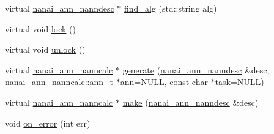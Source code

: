 \begin{DoxyCompactItemize}
\item 
virtual \hyperlink{namespacenanai_a892a8c80381d0005a076b68fbbf2d918}{nanai\+\_\+ann\+\_\+nanndesc} $\ast$ \hyperlink{classnanai_1_1nanai__ann__nannmgr_aa3fdb4c566c9f8b670631fb559cf1b02}{find\+\_\+alg} (std\+::string alg)
\item 
virtual void \hyperlink{classnanai_1_1nanai__ann__nannmgr_ad67bf88a3df568c5ed07c2adca863be8}{lock} ()
\item 
virtual void \hyperlink{classnanai_1_1nanai__ann__nannmgr_a061504e906faa17ab8cfeccb0f6c17bf}{unlock} ()
\item 
virtual \hyperlink{classnanai_1_1nanai__ann__nanncalc}{nanai\+\_\+ann\+\_\+nanncalc} $\ast$ \hyperlink{classnanai_1_1nanai__ann__nannmgr_a66d329677b38c6d967a737adabaae13e}{generate} (\hyperlink{namespacenanai_a892a8c80381d0005a076b68fbbf2d918}{nanai\+\_\+ann\+\_\+nanndesc} \&desc, \hyperlink{classnanai_1_1nanai__ann__nanncalc_1_1ann__t}{nanai\+\_\+ann\+\_\+nanncalc\+::ann\+\_\+t} $\ast$ann=N\+U\+L\+L, const char $\ast$task=N\+U\+L\+L)
\item 
virtual \hyperlink{classnanai_1_1nanai__ann__nanncalc}{nanai\+\_\+ann\+\_\+nanncalc} $\ast$ \hyperlink{classnanai_1_1nanai__ann__nannmgr_a5f3d6ac53777ccec4d85cde98267693f}{make} (\hyperlink{namespacenanai_a892a8c80381d0005a076b68fbbf2d918}{nanai\+\_\+ann\+\_\+nanndesc} \&desc)
\item 
void \hyperlink{classnanai_1_1nanai__ann__nannmgr_a28ea36058e9dfd5ce6b80d6011931acc}{on\+\_\+error} (int err)
\end{DoxyCompactItemize}

